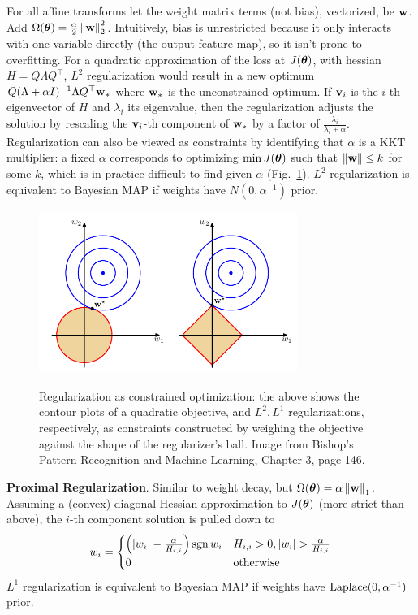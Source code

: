 \documentclass{article}
\begin{document}
For all affine transforms let the weight matrix terms (not bias), vectorized, be $\textbf{w}$. Add $\Omega({\boldsymbol\theta})=\frac{\alpha}{2}\left\| \textbf{w} \right\|_2^2$. Intuitively, bias is unrestricted because it only interacts with one variable directly (the output feature map), so it isn't prone to overfitting. For a quadratic approximation of the loss at $J({\boldsymbol\theta})$, with hessian $H=Q\Lambda Q^\top$, $L^2$ regularization would result in a new optimum $Q(\Lambda+\alpha I)^{-1}\Lambda Q^\top \textbf{w}_*$ where $\textbf{w}_*$ is the unconstrained optimum. If $\textbf{v}_i$ is the $i$-th eigenvector of $H$ and $\lambda_i$ its eigenvalue, then the regularization adjusts the solution by rescaling the $\textbf{v}_i$-th component of $\textbf{w}_*$ by a factor of $\frac{\lambda_i}{\lambda_i+\alpha}$. Regularization can also be viewed as constraints by identifying that $\alpha$ is a KKT multiplier: a fixed $\alpha$ corresponds to optimizing $\min J({\boldsymbol\theta})$ such that $\left\| \textbf{w} \right\|\le k$ for some $k$, which is in practice difficult to find given $\alpha$ (Fig.~\ref{fig:reg}). $L^2$ regularization is equivalent to Bayesian MAP if weights have $N(0,\alpha^{-1})$ prior.
\begin{figure}[!h]
\centering
{\includegraphics[width=0.75\textwidth]{reg.pdf}}
  \caption{Regularization as constrained optimization: the above shows the contour plots of a quadratic objective, and $L^2,L^1$ regularizations, respectively, as constraints constructed by weighing the objective against the shape of the regularizer's ball. Image from Bishop's Pattern Recognition and Machine Learning, Chapter 3, page 146.}
\label{fig:reg}
\end{figure}

\textbf{Proximal Regularization}. Similar to weight decay, but $\Omega({\boldsymbol\theta})=\alpha\left\| \textbf{w} \right\|_1$. Assuming a (convex) diagonal Hessian approximation to $J({\boldsymbol\theta})$ (more strict than above), the $i$-th component solution is pulled down to
$$w_i=\begin{cases}
\pa{\abs{w_i}-\frac{\alpha}{H_{i,i}}}\sgn w_i  & H_{i,i}>0, \abs{w_i}>\frac{\alpha}{H_{i,i}}\\
  0 & \text{otherwise}
\end{cases}$$
$L^1$ regularization is equivalent to Bayesian MAP if weights have $\operatorname{Laplace}(0, \alpha^{-1})$ prior.
\end{document}
